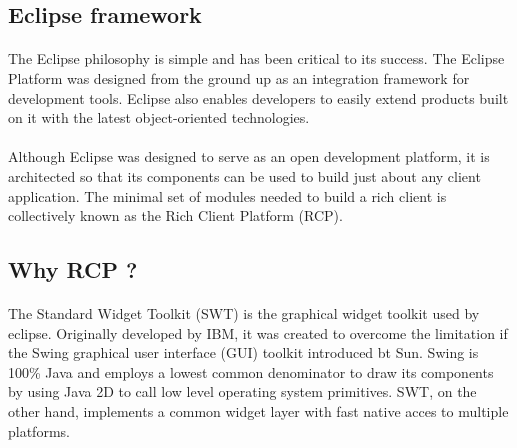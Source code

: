 \subsection{Eclipse framework}

\paragraph{}
The Eclipse philosophy is simple and has been critical to its success. The Eclipse Platform
was designed from the ground up as an integration framework for development tools. Eclipse
also enables developers to easily extend products built on it with the latest object-oriented
technologies.
\paragraph{}
Although Eclipse was designed to serve as an open development platform, it is architected
so that its components can be used to build just about any client application. The minimal set
of modules needed to build a rich client is collectively known as the Rich Client Platform (RCP).

\subsection{Why RCP ?}
\paragraph{}
The Standard Widget Toolkit (SWT) is the graphical widget toolkit used by eclipse. Originally developed by
IBM, it was created to overcome the limitation if the Swing graphical user interface (GUI) toolkit introduced
bt Sun. Swing is 100\% Java and employs a lowest common denominator to draw its components by using Java 2D to call low level operating system primitives. SWT, on the other hand, implements a common widget layer with fast native acces to multiple platforms.

